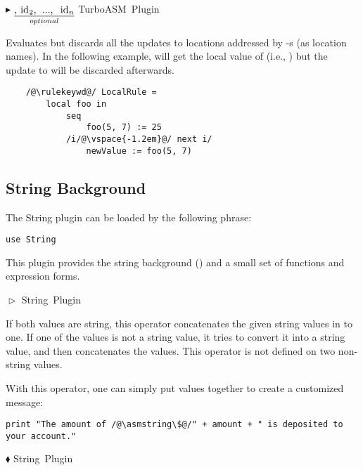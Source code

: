 \documentclass{article}
\makeatletter
\newcommand{\ruleform}[2]{\pform{$\blacktriangleright$}{#1}{#2}}
\newcommand{\funcform}[2]{\pform{$\blacklozenge$}{#1}{#2}}
\newcommand{\opform}[2]{\pform{$\vartriangleright$}{#1}{#2}}
\newcommand{\pform}[3]{\vspace*{4mm} \noindent #1 #2 \vspace{1mm}\textcolor[gray]{0.7}{\dotfill}\mbox{{\sffamily \footnotesize #3}}}
\newcommand{\optional}[1]{$\underset{optional}{\underline{\mbox{#1}}}$}
\newcommand{\indexrule}[1]{\index{#1 rule@\asm{#1} rule}}
\makeatother
\begin{document}
\ruleform{
	\hspace{-.4em}
	\optional{, \asm{id$_2$, ..., id$_n$}}
	\asm{in rule}
}{TurboASM Plugin}
\indexrule{local}

Evaluates  but discards all the updates to locations addressed by -s (as location names). 
In the following example,  will get the local value of  (i.e., ) 
but the update to  will be discarded afterwards.

\begin{lstlisting}
	/@\rulekeywd@/ LocalRule =
		local foo in
			seq
				foo(5, 7) := 25
			/i/@\vspace{-1.2em}@/ next i/
				newValue := foo(5, 7)
\end{lstlisting}


\subsection{String Background}
\label{string}

The String plugin can be loaded by the following  phrase:

\begin{lstlisting}
use String
\end{lstlisting}

\noindent This plugin provides the string background () and
a small set of functions and expression forms. 

\opform{
}{String Plugin}

If both values are string, this operator concatenates the given string values in to one. If one of the values is not a string value, it tries to convert it into a string value, and then concatenates the values. This operator is not defined on two non-string values.

With this operator, one can simply put values together to create a customized message:

\begin{lstlisting}
print "The amount of /@\asmstring\$@/" + amount + " is deposited to your account."
\end{lstlisting}

\funcform{
}{String Plugin}
\end{document}
